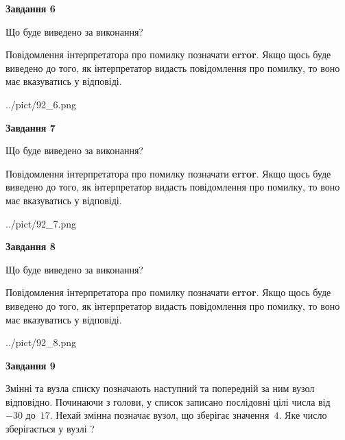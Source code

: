 \documentclass[12pt, ukrainian]{article}
\begin{document}
{\begin {large}
{\begin {center}\textbf{Завдання 6}\end {center}}\par
Що буде виведено за виконання?

Повідомлення інтерпретатора про помилку позначати \textbf{error}.
Якщо щось буде виведено до того, як інтерпретатор видасть повідомлення про помилку, 
то воно має вказуватись у відповіді. \par


\begin{center}
	{../pict/92_6.png}
\end{center}
\newpage

{\begin {center}\textbf{Завдання 7}\end {center}}\par
Що буде виведено за виконання?

Повідомлення інтерпретатора про помилку позначати \textbf{error}.
Якщо щось буде виведено до того, як інтерпретатор видасть повідомлення про помилку, 
то воно має вказуватись у відповіді. \par


\begin{center}
	{../pict/92_7.png}
\end{center}
\newpage

{\begin {center}\textbf{Завдання 8}\end {center}}\par
Що буде виведено за виконання?

Повідомлення інтерпретатора про помилку позначати \textbf{error}.
Якщо щось буде виведено до того, як інтерпретатор видасть повідомлення про помилку, 
то воно має вказуватись у відповіді. \par


\begin{center}
	{../pict/92_8.png}
\end{center}
\newpage

{\begin {center}\textbf{Завдання 9}\end {center}}\par
Змінні  та  вузла списку позначають наступний та попередній за ним вузол відповідно. Починаючи з голови, у список записано послідовні цілі числа від~$-30$ до~$17$. Нехай змінна  позначає вузол, що зберігає значення~$4$.
Яке число зберігається у вузлі  ?\par
\newpage


\end{large}}
\end{document}

